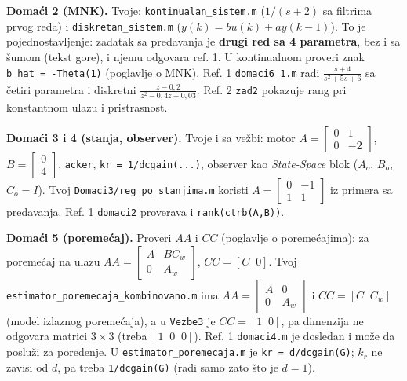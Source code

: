 \documentclass[11pt,a4paper,parskip=half,headsepline,numbers=noenddot]{scrartcl}
\begin{document}
\textbf{Domaći 2 (MNK).} Tvoje: \texttt{kontinualan\_\allowbreak{}sistem.m} (\(1/(s+2)\) sa filtrima prvog reda) i \texttt{diskretan\_\allowbreak{}sistem.m} (\(y(k) = bu(k) + ay(k-1)\)). To je pojednostavljenje: zadatak sa predavanja je \textbf{drugi red sa 4 parametra}, bez i sa šumom (tekst gore), i njemu odgovara ref. 1. U kontinualnom proveri znak \texttt{b\_\allowbreak{}hat\ =\ -Theta(\allowbreak{}1)} (poglavlje o MNK). Ref. 1 \texttt{domaci6\_\allowbreak{}1.m} radi \(\frac{s+4}{s^2+5s+6}\) sa četiri parametra i diskretni \(\frac{z - 0{,}2}{z^2 - 0{,}4z + 0{,}03}\). Ref. 2 \texttt{zad2} pokazuje rang pri konstantnom ulazu i pristrasnost.

\textbf{Domaći 3 i 4 (stanja, observer).} Tvoje i sa vežbi: motor \(A = \begin{bmatrix}0 & 1\\ 0 & -2\end{bmatrix}\), \(B = \begin{bmatrix}0\\ 4\end{bmatrix}\), \texttt{acker}, \texttt{kr\ =\ 1/\allowbreak{}dcgain(\allowbreak{}...)}, observer kao \emph{State-Space} blok (\(A_o\), \(B_o\), \(C_o = I\)). Tvoj \texttt{Domaci3/\allowbreak{}reg\_\allowbreak{}po\_\allowbreak{}stanjima.m} koristi \(A = \begin{bmatrix}0 & -1\\ 1 & 1\end{bmatrix}\) iz primera sa predavanja. Ref. 1 \texttt{domaci2} proverava i \texttt{rank(\allowbreak{}ctrb(\allowbreak{}A,\allowbreak{}B))}.

\textbf{Domaći 5 (poremećaj).} Proveri \(AA\) i \(CC\) (poglavlje o poremećajima): za poremećaj na ulazu \(AA = \begin{bmatrix}A & BC_w\\ 0 & A_w\end{bmatrix}\), \(CC = [C\;\; 0]\). Tvoj \texttt{estimator\_\allowbreak{}poremecaja\_\allowbreak{}kombinovano.m} ima \(AA = \begin{bmatrix}A & 0\\ 0 & A_w\end{bmatrix}\) i \(CC = [C\;\; C_w]\) (model izlaznog poremećaja), a u \texttt{Vezbe3} je \(CC = [1\;\; 0]\), pa dimenzija ne odgovara matrici \(3\times 3\) (treba \([1\;\; 0\;\; 0]\)). Ref. 1 \texttt{domaci4.m} je dosledan i može da posluži za poređenje. U \texttt{estimator\_\allowbreak{}poremecaja.m} je \texttt{kr\ =\ d/\allowbreak{}dcgain(\allowbreak{}G)}; \(k_r\) ne zavisi od \(d\), pa treba \texttt{1/\allowbreak{}dcgain(\allowbreak{}G)} (radi samo zato što je \(d = 1\)).
\end{document}
